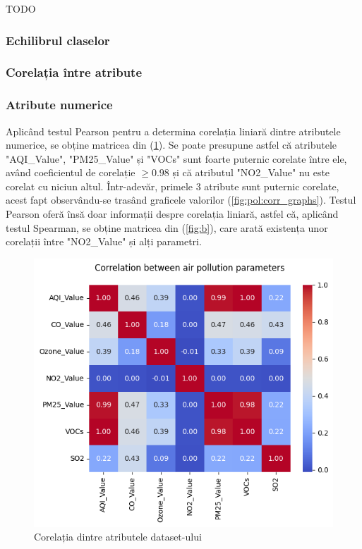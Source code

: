 \documentclass{article}
\begin{document}
TODO
\subsubsection{Echilibrul claselor}



\subsubsection{Corelația între atribute}
\subsubsection{Atribute numerice}
Aplicând testul Pearson pentru a determina corelația liniară dintre atributele 
numerice, se obține matricea din (\ref{fig:pol:corr}). Se poate presupune
astfel că atributele "AQI\_Value", "PM25\_Value" și "VOCs" sunt foarte puternic 
corelate între ele, având coeficientul de corelație $\geq 0.98$ și că atributul 
"NO2\_Value" nu este corelat cu niciun altul. Într-adevăr, primele 3 atribute 
sunt puternic corelate, acest fapt observându-se trasând graficele valorilor 
(\ref{fig:pol:corr_graphs}). Testul Pearson oferă însă doar informații despre
corelația liniară, astfel că, aplicând testul Spearman, se obține matricea din 
(\ref{fig:b}), care arată existența unor corelații între "NO2\_Value" și alți
parametri.

\begin{figure}[ht]
    \centering
    \includegraphics[scale=0.6]{images/air_pollution/correlation/matrix.png}
    \caption{Corelația dintre atributele dataset-ului}
    \label{fig:pol:corr}
\end{figure}
\end{document}
